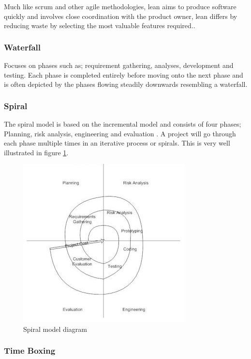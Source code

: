 Much like scrum and other agile methodologies, lean aims to produce
software quickly and involves close coordination with the product owner,
lean differs by reducing waste by selecting the most valuable features
required.\parencite{agilemethods}.

\subsubsection{Waterfall}\label{waterfall}

Focuses on phases such as; requirement gathering, analyses, development
and testing. Each phase is completed entirely before moving onto the
next phase and is often depicted by the phases flowing steadily
downwards resembling a waterfall.

\subsubsection{Spiral}\label{spiral}

The spiral model is based on the incremental model and consists of four
phases; Planning, risk analysis, engineering and evaluation
\parencite{spiral}. A project will go through each phase multiple times
in an iterative process or spirals. This is very well illustrated in
figure \ref{fig:spiral}.

\begin{figure}
\centering
\includegraphics{../../Images/Spiral-model.jpg}
\caption{Spiral model diagram \parencite{spiral} \label{fig:spiral}}
\end{figure}

\subsubsection{Time Boxing}\label{time-boxing}

